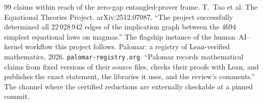 \documentclass[11pt]{article}
\begin{document}
\begin{thebibliography}{99}
claims within reach of the zero-gap entangled-prover frame.
 T.~Tao et al. The Equational Theories Project.
arXiv:2512.07087.
``The project successfully determined all 22\,028\,942 edges of the
implication graph between the 4694 simplest equational laws on
magmas.'' The flagship instance of the human--AI--kernel workflow
this project follows.
 Palomar: a registry of Lean-verified
mathematics, 2026. \texttt{palomar-registry.org}.
``Palomar records mathematical claims from fixed versions of their
source files, checks their proofs with Lean, and publishes the exact
statement, the libraries it uses, and the review's comments.'' The
channel where the certified reductions are externally checkable at a
pinned commit.
\end{thebibliography}
\end{document}
